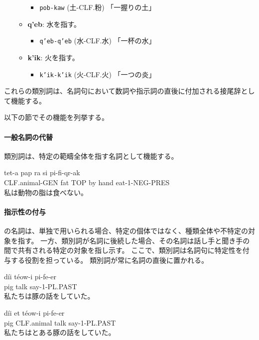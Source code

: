 \begin{itemize}
\begin{itemize}
                \begin{itemize}
                    \item \texttt{pob-kaw} (土-CLF.粉) %
                    \quad 「一握りの土」
                \end{itemize}
            \item \textbf{q'eb}: 水を指す。%
                \begin{itemize}
                    \item \texttt{q'eb-q'eb} (水-CLF.水)
                    \quad 「一杯の水」
                \end{itemize}
            \item \textbf{k'ik}: 火を指す。%
                \begin{itemize}
                    \item \texttt{k'ik-k'ik} (火-CLF.火)
                    \quad 「一つの炎」
                \end{itemize}
        \end{itemize}
\end{itemize}
これらの類別詞は、名詞句において数詞や指示詞の直後に付加される接尾辞として機能する。

以下の節でその機能を列挙する。

\paragraph{一般名詞の代替}
類別詞は、特定の範疇全体を指す名詞として機能する。
\begin{exe}
\ex \gll tet-a pap ra si pi-fi-qr-ak\\
        CLF.animal-GEN fat TOP by hand eat-1-NEG-PRES\\
\glt 私は動物の脂は食べない。
\end{exe}

\paragraph{指示性の付与}

\langname の名詞は、単独で用いられる場合、特定の個体ではなく、種類全体や不特定の対象を指す。
一方、類別詞が名詞に後続した場合、その名詞は話し手と聞き手の間で共有される特定の対象を指し示す。
ここで、類別詞は名詞句に特定性を付与する役割を担っている。
類別詞が常に名詞の直後に置かれる。
\begin{exe}
\ex \gll d\'ii t\'eow-i pi-fe-er\\
pig talk say-1-PL.PAST \\
\glt 私たちは豚の話をしていた。
\end{exe}
\begin{exe}
\ex \gll d\'ii et t\'eow-i pi-fe-er\\
pig CLF.animal talk say-1-PL.PAST \\
\glt 私たちはとある豚の話をしていた。
\end{exe}


